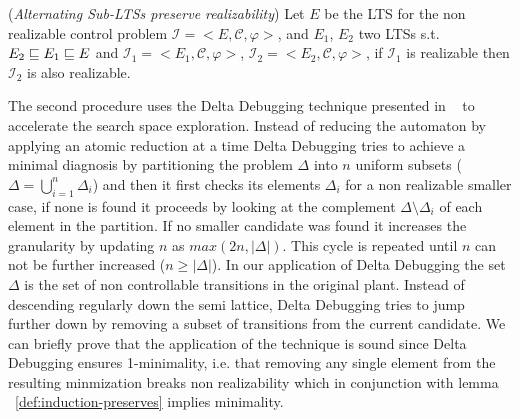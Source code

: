 \begin{lemma}\label{def:induction-preserves}(\emph{Alternating Sub-LTSs preserve realizability})
	Let $E$ be the LTS for the non realizable control problem
	$\mathcal{I}=<E,\mathcal{C}, \varphi>$, and $E_1$, $E_2$ two LTSs s.t. 
	$E_2 \sqsubseteq E_1 \sqsubseteq E$ and
	$\mathcal{I}_1=<E_1, \mathcal{C}, \varphi>$, $\mathcal{I}_2=<E_2, \mathcal{C}, \varphi>$, if $\mathcal{I}_1$ is realizable then $\mathcal{I}_2$ is also realizable.
\end{lemma}


The second procedure uses the Delta Debugging technique presented in ~\cite{DBLP:journals/tse/ZellerH02} to accelerate the search space exploration. Instead of reducing the automaton by applying an atomic reduction at a time Delta Debugging tries to achieve a minimal diagnosis by partitioning the problem $\Delta$ into $n$ uniform subsets ($\Delta = \bigcup_{i=1}^n \Delta_i $) and then it first checks its elements $\Delta_i$ for a non realizable smaller case, if none is found it proceeds by looking at the complement $\Delta \setminus \Delta_i$ of each element in the partition. If no smaller candidate was found it increases the granularity by updating $n$ as $max(2n,|\Delta|)$. This cycle is repeated until $n$ can not be further increased ($n \geq |\Delta|$). 
In our application of Delta Debugging the set $\Delta$ is the set of non controllable transitions in the original plant. Instead of descending regularly down the semi lattice, Delta Debugging tries to jump further down by removing a subset of transitions from the current candidate. We can briefly prove that the application of the technique is sound since Delta Debugging ensures 1-minimality, i.e. that removing any single element from the resulting minmization breaks non realizability which in conjunction with lemma ~\ref{def:induction-preserves} implies minimality.
